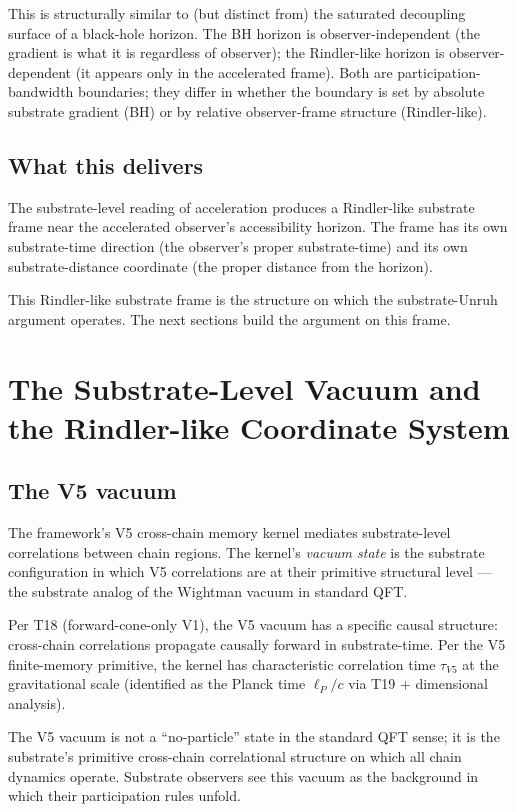 \documentclass[11pt,a4paper]{article}
\begin{document}
This is structurally similar to (but distinct from) the saturated decoupling surface of a black-hole horizon. The BH horizon is observer-independent (the gradient is what it is regardless of observer); the Rindler-like horizon is observer-dependent (it appears only in the accelerated frame). Both are participation-bandwidth boundaries; they differ in whether the boundary is set by absolute substrate gradient (BH) or by relative observer-frame structure (Rindler-like).

\subsection{What this delivers}

The substrate-level reading of acceleration produces a Rindler-like substrate frame near the accelerated observer's accessibility horizon. The frame has its own substrate-time direction (the observer's proper substrate-time) and its own substrate-distance coordinate (the proper distance from the horizon).

This Rindler-like substrate frame is the structure on which the substrate-Unruh argument operates. The next sections build the argument on this frame.

\section{The Substrate-Level Vacuum and the Rindler-like Coordinate System}

\subsection{The V5 vacuum}

The framework's V5 cross-chain memory kernel mediates substrate-level correlations between chain regions. The kernel's \emph{vacuum state} is the substrate configuration in which V5 correlations are at their primitive structural level --- the substrate analog of the Wightman vacuum in standard QFT.

Per T18 (forward-cone-only V1), the V5 vacuum has a specific causal structure: cross-chain correlations propagate causally forward in substrate-time. Per the V5 finite-memory primitive, the kernel has characteristic correlation time $\tau_{V5}$ at the gravitational scale (identified as the Planck time $\ell_P/c$ via T19 + dimensional analysis).

The V5 vacuum is not a ``no-particle'' state in the standard QFT sense; it is the substrate's primitive cross-chain correlational structure on which all chain dynamics operate. Substrate observers see this vacuum as the background in which their participation rules unfold.
\end{document}
